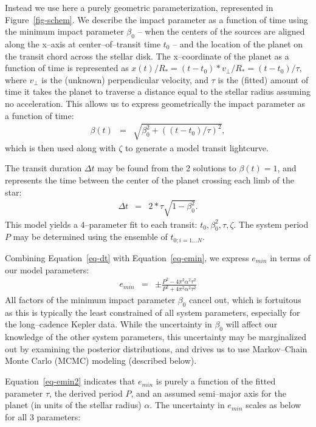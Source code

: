 Instead we use here a purely geometric parameterization, represented
in Figure~\ref{fig-schem}.  We describe the impact parameter as a
function of time using the minimum impact parameter $\beta_0$ -- when
the centers of the sources are aligned along the x--axis at
center--of--transit time $t_0$ -- and the location of the planet on
the transit chord across the stellar disk.  The x--coordinate of the
planet as a function of time is represented as $x(t) / R_* = (t - t_0)
* v_\perp / R_* = (t - t_0) / \tau$, where $v_\perp$ is the (unknown)
perpendicular velocity, and $\tau$ is the (fitted) amount of time it
takes the planet to traverse a distance equal to the stellar radius
assuming no acceleration.  This allows us to express geometrically the
impact parameter as a function of time:
\begin{eqnarray}
\beta(t) & = & \sqrt{\beta_0^2 + \left((t - t_0) / \tau\right)^2},
\end{eqnarray}
which is then used along with $\zeta$ to generate a model transit
lightcurve.

The transit duration $\Delta t$ may be found from the 2 solutions to
$\beta(t) = 1$, and represents the time between the center of the
planet crossing each limb of the star:
\begin{eqnarray}
\Delta t & = & 2 * \tau \sqrt{1 - \beta_0^2}.
\label{eq-dt}
\end{eqnarray}
This model yields a 4--parameter fit to each transit: $t_0, \beta_0^2,
\tau, \zeta$.  The system period $P$ may be determined using the
ensemble of $t_{0;i=1...N}$.

Combining Equation~\ref{eq-dt} with Equation~\ref{eq-emin}, we express
$e_{min}$ in terms of our model parameters:
\begin{eqnarray}
e_{min} & = & \pm \frac{P^{2} - 4 \pi^{2} \alpha^{2} \tau^{2}}{P^{2} + 4 \pi^{2} \alpha^{2} \tau^{2}}
\label{eq-emin2}
\end{eqnarray}
All factors of the minimum impact parameter $\beta_0$ cancel out,
which is fortuitous as this is typically the least constrained of all
system parameters, especially for the long--cadence Kepler data.
While the uncertainty in $\beta_0$ will affect our knowledge of the
other system parameters, this uncertainty may be marginalized out by
examining the posterior distributions, and drives us to use
Markov--Chain Monte Carlo (MCMC) modeling (described below).

Equation~\ref{eq-emin2} indicates that $e_{min}$ is purely a function
of the fitted parameter $\tau$, the derived period $P$, and an assumed
semi--major axis for the planet (in units of the stellar radius)
$\alpha$.  The uncertainty in $e_{min}$ scales as below for all 3
parameters:

